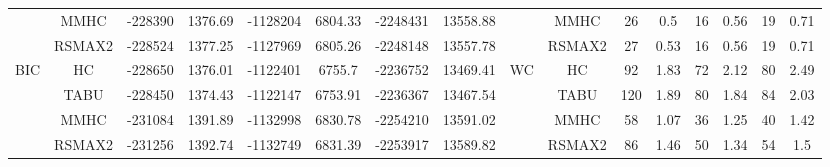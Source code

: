 \begin{table}[p]
{\begin{tabular}{cc||cc|cc|cc||cc|cc|cc|cc}
& MMHC &	-228390 & 	1376.69 & 	-1128204 & 	6804.33 & 	-2248431 & 	13558.88 & 	& MMHC &	26 & 	0.5 & 	16 & 	0.56 & 	19 & 	0.71\tabularnewline													
& RSMAX2 &	-228524 & 	1377.25 & 	-1127969 & 	6805.26 & 	-2248148 & 	13557.78 & 	& RSMAX2 &	27 & 	0.53 & 	16 & 	0.56 & 	19 & 	0.71\tabularnewline													
\hline																										
\multirow{4}{*}{BIC} & HC &	-228650 & 	1376.01 & 	-1122401 & 	6755.7 & 	-2236752 & 	13469.41 & 	\multirow{4}{*}{WC} & HC &	92 & 	1.83 & 	72 & 	2.12 & 	80 & 	2.49\tabularnewline													
& TABU &	-228450 & 	1374.43 & 	-1122147 & 	6753.91 & 	-2236367 & 	13467.54 & 	& TABU &	120 & 	1.89 & 	80 & 	1.84 & 	84 & 	2.03\tabularnewline													
& MMHC &	-231084 & 	1391.89 & 	-1132998 & 	6830.78 & 	-2254210 & 	13591.02 & 	& MMHC &	58 & 	1.07 & 	36 & 	1.25 & 	40 & 	1.42\tabularnewline													
& RSMAX2 &	-231256 & 	1392.74 & 	-1132749 & 	6831.39 & 	-2253917 & 	13589.82 & 	& RSMAX2 &	86 & 	1.46 & 	50 & 	1.34 & 	54 & 	1.5\tabularnewline													
\hline																										
\end{tabular}																										
}																										
\end{table}																										


